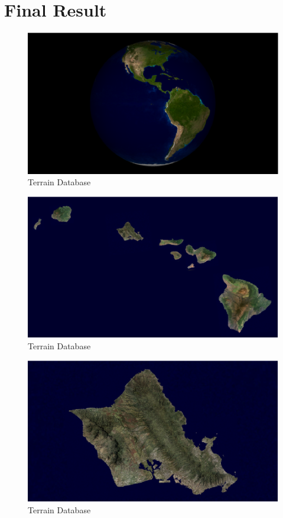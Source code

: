 \chapter{Final Result}

\begin{figure}
  \centering
  \includegraphics[width=120mm]{images/vpb_scenery_01.eps}
  \caption{Terrain Database}
\end{figure}

\begin{figure}
  \centering
  \includegraphics[width=120mm]{images/vpb_scenery_02.eps}
  \caption{Terrain Database}
\end{figure}

\begin{figure}
  \centering
  \includegraphics[width=120mm]{images/vpb_scenery_03.eps}
  \caption{Terrain Database}
\end{figure}

